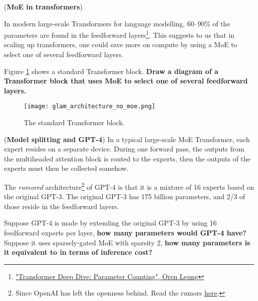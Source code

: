 \begin{enumerate}
    \qitem (\textbf{MoE in transformers})

    In modern large-scale Transformers for language modelling, 60--90\% of the parameters are found in the feedforward layers\footnote{\href{https://web.archive.org/web/20230412193251/https://orenleung.com/transformer-parameter-counting}{"Transformer Deep Dive: Parameter Counting", Oren Leung}}. This suggests to us that in scaling up transformers, one could save more on compute by using a MoE to select one of several feedforward layers. 

    Figure \ref{fig:glam_architecture_no_moe} shows a standard Transformer block. \textbf{Draw a diagram of a Transformer block that uses MoE to select one of several feedforward layers.}
    
    \begin{figure}[!htb]
        \centering
        \texttt{[image: glam\_architecture\_no\_moe.png]}
        \caption{The standard Transformer block.}
        \label{fig:glam_architecture_no_moe}
    \end{figure}


    \qitem (\textbf{Model splitting and GPT-4}) In a typical large-scale MoE Transformer, each expert resides on a separate device. During one forward pass, the outputs from the multiheaded attention block is routed to the experts, then the outputs of the experts must then be collected somehow.

    The \textit{rumored} architecture\footnote{Since OpenAI has left the openness behind. Read the rumors \href{https://web.archive.org/web/20231026004256/https://dumb.one/gpt/articles/2023-07-10-gpt4.html}{here}.} of GPT-4 is that it is a mixture of 16 experts based on the original GPT-3. The original GPT-3 has 175 billion parameters, and 2/3 of those reside in the feedforward layers. 

    Suppose GPT-4 is made by extending the original GPT-3 by using 16 feedforward experts per layer, \textbf{how many parameters would GPT-4 have?} Suppose it uses sparsely-gated MoE with sparsity 2, \textbf{how many parameters is it equivalent to in terms of inference cost?}


\end{enumerate}
